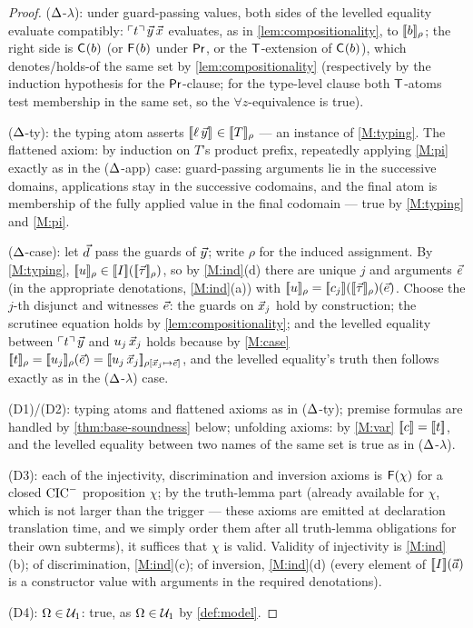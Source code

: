 \begin{proof}
($\Delta$-$\lambda$): under guard-passing values, both sides of the
levelled equality evaluate compatibly: $\ulcorner t \urcorner\,\vec{y}\,\vec{x}$
evaluates, as in \cref{lem:compositionality}, to
$[\![ b ]\!]_{\rho}$; the right side is $\mathsf{C}_{}(b)$ (or
$\mathsf{F}_{}(b)$ under $\mathsf{Pr}$, or the $\mathsf{T}$-extension of
$\mathsf{C}_{}(b)$), which denotes/holds-of the same set by
\cref{lem:compositionality} (respectively by the induction
hypothesis for the $\mathsf{Pr}$-clause; for the type-level clause both
$\mathsf{T}$-atoms test membership in the same set, so the
$\forall z$-equivalence is true).

($\Delta$-ty): the typing atom asserts $[\![ \ell\,\vec{y} ]\!]_{} \in
[\![ T ]\!]_{\rho}$ --- an instance of \ref{M:typing}.  The flattened
axiom: by induction on $T$'s product prefix, repeatedly applying
\ref{M:pi} exactly as in the ($\Delta$-app) case: guard-passing
arguments lie in the successive domains, applications stay in the
successive codomains, and the final atom is membership of the fully
applied value in the final codomain --- true by \ref{M:typing} and
\ref{M:pi}.

($\Delta$-case): let $\vec{d}$ pass the guards of $\vec{y}$; write
$\rho$ for the induced assignment.  By \ref{M:typing},
$[\![ u ]\!]_{\rho} \in [\![ I ]\!]([\![ \vec{\tau} ]\!]_{\rho})$, so by
\ref{M:ind}(d) there are unique $j$ and arguments $\vec{e}$ (in the
appropriate denotations, \ref{M:ind}(a)) with $[\![ u ]\!]_{\rho} =
[\![ c_j ]\!]([\![ \vec{\tau} ]\!]_{\rho})(\vec{e})$.  Choose the $j$-th
disjunct and witnesses $\vec{e}$: the guards on $\vec{x}_j$ hold by
construction; the scrutinee equation holds by
\cref{lem:compositionality}; and the levelled equality between
$\ulcorner t \urcorner\,\vec{y}$ and $u_j\,\vec{x}_j$ holds because by
\ref{M:case} $[\![ t ]\!]_{\rho} = [\![ u_j ]\!]_{\rho}(\vec{e}) =
[\![ u_j\,\vec{x}_j ]\!]_{\rho[\vec{x}_j \mapsto \vec{e}]}$, and the
levelled equality's truth then follows exactly as in the
($\Delta$-$\lambda$) case.

(D1)/(D2): typing atoms and flattened axioms as in ($\Delta$-ty);
premise formulas are handled by \cref{thm:base-soundness} below;
unfolding axioms: by \ref{M:var} $[\![ c ]\!] = [\![ t ]\!]$, and the
levelled equality between two names of the same set is true as in
($\Delta$-$\lambda$).

(D3): each of the injectivity, discrimination and inversion axioms
is $\mathsf{F}(\chi)$ for a closed $\mathrm{CIC}^{-}$ proposition $\chi$; by the
truth-lemma part (already available for $\chi$, which is not larger
than the trigger --- these axioms are emitted at declaration
translation time, and we simply order them after all truth-lemma
obligations for their own subterms), it suffices that $\chi$ is
valid.  Validity of injectivity is \ref{M:ind}(b); of
discrimination, \ref{M:ind}(c); of inversion, \ref{M:ind}(d)
(every element of $[\![ I ]\!](\vec{a})$ is a constructor value with
arguments in the required denotations).

(D4): $\Omega \in \mathcal{U}_1$: true, as $\Omega \in \mathcal{U}_1$ by
\cref{def:model}.
\end{proof}

